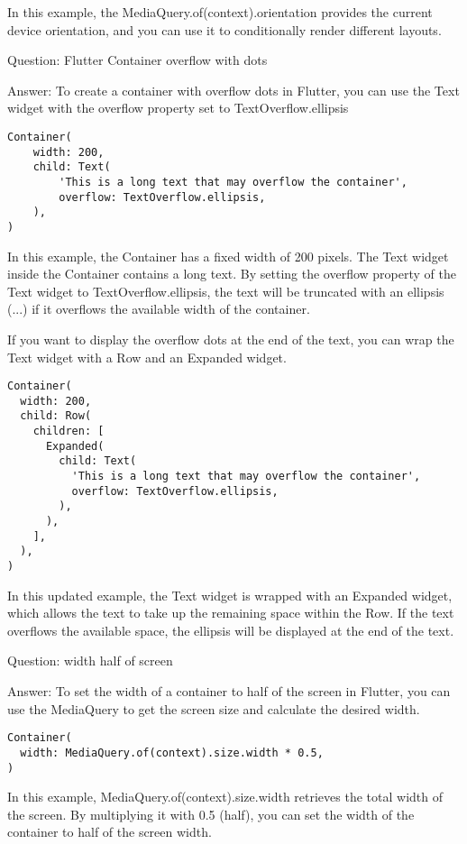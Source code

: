 In this example, the MediaQuery.of(context).orientation provides the current device orientation, and you can use it 
to conditionally render different layouts.

Question: Flutter Container overflow with dots

Answer: To create a container with overflow dots in Flutter, you can use the Text widget with the overflow 
property set to TextOverflow.ellipsis

\begin{lstlisting}
Container(
    width: 200,
    child: Text(
        'This is a long text that may overflow the container',
        overflow: TextOverflow.ellipsis,
    ),
)      
\end{lstlisting}

In this example, the Container has a fixed width of 200 pixels. The Text widget inside the Container contains a 
long text. By setting the overflow property of the Text widget to TextOverflow.ellipsis, the text will be truncated 
with an ellipsis (...) if it overflows the available width of the container.

If you want to display the overflow dots at the end of the text, you can wrap the Text widget with a Row and an 
Expanded widget. 

\begin{lstlisting}
Container(
  width: 200,
  child: Row(
    children: [
      Expanded(
        child: Text(
          'This is a long text that may overflow the container',
          overflow: TextOverflow.ellipsis,
        ),
      ),
    ],
  ),
)
\end{lstlisting}

In this updated example, the Text widget is wrapped with an Expanded widget, which allows the text to take up the 
remaining space within the Row. If the text overflows the available space, the ellipsis will be displayed at the 
end of the text.


Question: width half of screen

Answer: To set the width of a container to half of the screen in Flutter, you can use the MediaQuery to get the 
screen size and calculate the desired width. 

\begin{lstlisting}
Container(
  width: MediaQuery.of(context).size.width * 0.5,
)
\end{lstlisting}

In this example, MediaQuery.of(context).size.width retrieves the total width of the screen. By multiplying it with 0.5
 (half), you can set the width of the container to half of the screen width.


